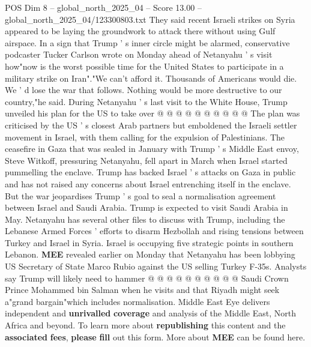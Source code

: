 \begin{textsample}{POS Dim 8 – global\_north\_2025\_04 – Score 13.00 – global\_north\_2025\_04/123300803.txt}
They said recent Israeli strikes on Syria appeared to be laying the groundwork to attack there without using Gulf airspace.
In a sign that Trump ' s inner circle might be alarmed, conservative podcaster Tucker Carlson wrote on Monday ahead of Netanyahu ' s visit how"now is the worst possible time for the United States to participate in a military strike on Iran"."We can't afford it.
Thousands of Americans would die.
We ' d lose the war that follows.
Nothing would be more destructive to our country,"he said.
During Netanyahu ' s last visit to the White House, Trump unveiled his plan for the US to take over @ @ @ @ @ @ @ @ @ @ The plan was criticised by the US ' s closest Arab partners but emboldened the Israeli settler movement in Israel, with them calling for the expulsion of Palestinians.
The ceasefire in Gaza that was sealed in January with Trump ' s Middle East envoy, Steve Witkoff, pressuring Netanyahu, fell apart in March when Israel started pummelling the enclave.
Trump has backed Israel ' s attacks on Gaza in public and has not raised any concerns about Israel entrenching itself in the enclave.
But the war jeopardises Trump ' s goal to seal a normalisation agreement between Israel and Saudi Arabia.
Trump is expected to visit Saudi Arabia in May.
Netanyahu has several other files to discuss with Trump, including the Lebanese Armed Forces ' efforts to disarm Hezbollah and rising tensions between Turkey and Israel in Syria.
Israel is occupying five strategic points in southern Lebanon. \textbf{MEE} revealed earlier on Monday that Netanyahu has been lobbying US Secretary of State Marco Rubio against the US selling Turkey F-35s.
Analysts say Trump will likely need to hammer @ @ @ @ @ @ @ @ @ @ Saudi Crown Prince Mohammed bin Salman when he visits and that Riyadh might seek a"grand bargain"which includes normalisation.
Middle East Eye delivers independent and \textbf{unrivalled} \textbf{coverage} and analysis of the Middle East, North Africa and beyond.
To learn more about \textbf{republishing} this content and the \textbf{associated} \textbf{fees}, \textbf{please} \textbf{fill} out this form.
More about \textbf{MEE} can be found here.

\end{textsample}
